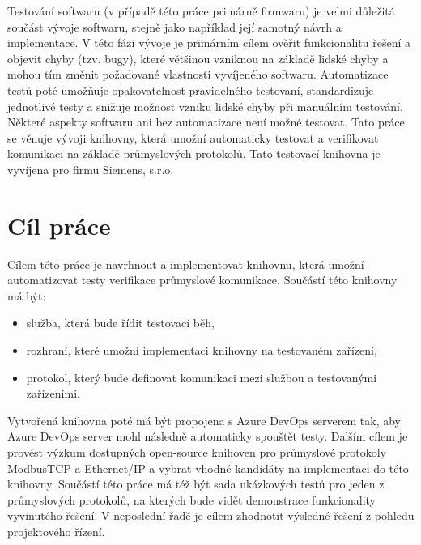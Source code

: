 \begin{introduction}
Testování softwaru (v případě této práce primárně firmwaru) je velmi důležitá součást vývoje softwaru,
stejně jako například její samotný návrh a implementace. V této fázi vývoje je primárním cílem ověřit
funkcionalitu řešení a objevit chyby (tzv. bugy), které většinou vzniknou na základě lidské chyby a mohou
tím změnit požadované vlastnosti vyvíjeného softwaru. Automatizace testů poté umožňuje opakovatelnost 
pravidelného testovaní, standardizuje jednotlivé testy a snižuje možnost vzniku lidské chyby při 
manuálním testování. Některé aspekty softwaru ani bez automatizace není možné testovat. Tato práce se 
věnuje vývoji knihovny, která umožní automaticky testovat a verifikovat komunikaci na základě 
průmyslových protokolů. Tato testovací knihovna je vyvíjena pro firmu Siemens, s.r.o. 

\section{Cíl práce}
Cílem této práce je navrhnout a implementovat knihovnu, která umožní automatizovat testy verifikace průmyslové komunikace. 
Součástí této knihovny má být:
\begin{itemize}
    \item služba, která bude řídit testovací běh,
    \item rozhraní, které umožní implementaci knihovny na testovaném zařízení,
    \item protokol, který bude definovat komunikaci mezi službou a testovanými zařízeními.
\end{itemize}
Vytvořená knihovna poté má být propojena s Azure DevOps serverem tak, aby Azure DevOps server mohl 
následně automaticky spouštět testy. Dalším cílem je provést výzkum dostupných open-source knihoven pro 
průmyslové protokoly ModbusTCP a Ethernet/IP a vybrat vhodné kandidáty na implementaci do této knihovny. 
Součástí této práce má též být sada ukázkových testů pro jeden z průmyslových protokolů, na kterých bude 
vidět demonstrace funkcionality vyvinutého řešení. V neposlední řadě je cílem zhodnotit výsledné řešení z 
pohledu projektového řízení.
\end{introduction}
